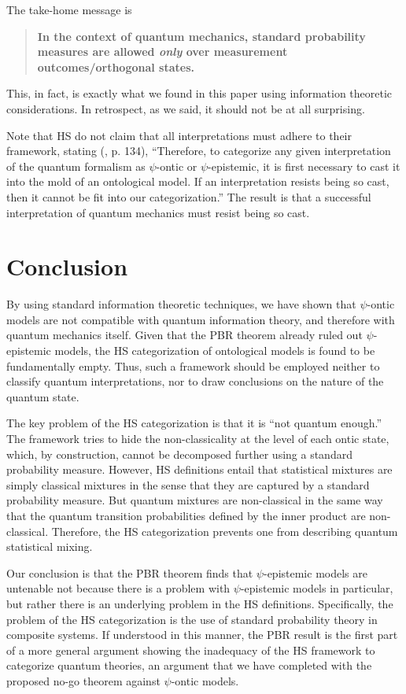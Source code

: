 \documentclass[10pt,twocolumn, nofootinbib]{revtex4-2}
\begin{document}
The take-home message is
\begin{quote}
	\textbf{In the context of quantum mechanics, standard probability measures are allowed \emph{only} over measurement outcomes/orthogonal states.}
\end{quote}
This, in fact, is exactly what we found in this paper using information theoretic considerations. In retrospect, as we said, it should not be at all surprising. 

Note that HS do not claim that all interpretations must adhere to their framework, stating (\cite{Harrigan:2010}, p. 134), ``Therefore, to categorize any given interpretation of the quantum formalism as $\psi$-ontic or $\psi$-epistemic, it is first necessary to cast it into the mold of an ontological model. If an interpretation resists being so cast, then it cannot be fit into our categorization.'' The result is that a successful interpretation of quantum mechanics must resist being so cast.

\section{Conclusion}

By using standard information theoretic techniques, we have shown that $\psi$-ontic models are not compatible with quantum information theory, and therefore with quantum mechanics itself. Given that the PBR theorem already ruled out $\psi$-epistemic models, the HS categorization of ontological models is found to be fundamentally empty. Thus, such a framework should be employed neither to classify quantum interpretations, nor to draw conclusions on the nature of the quantum state.

The key problem of the HS categorization is that it is ``not quantum enough.'' The framework tries to hide the non-classicality at the level of each ontic state, which, by construction, cannot be decomposed further using a standard probability measure. However, HS definitions entail that statistical mixtures are simply classical mixtures in the sense that they are captured by a standard probability measure. But quantum mixtures are non-classical in the same way that the quantum transition probabilities defined by the inner product are non-classical. Therefore, the HS categorization prevents one from describing quantum statistical mixing.

Our conclusion is that the PBR theorem finds that $\psi$-epistemic models are untenable not because there is a problem with $\psi$-epistemic models in particular, but rather there is an underlying problem in the HS definitions. Specifically, the problem of the HS categorization is the use of standard probability theory in composite systems. If understood in this manner, the PBR result is the first part of a more general argument showing the inadequacy of the HS framework to categorize quantum theories, an argument that we have completed with the proposed no-go theorem against $\psi$-ontic models.
\end{document}
